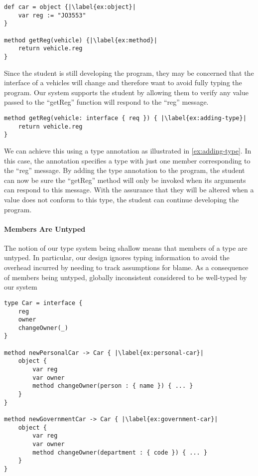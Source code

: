 \begin{lstlisting}[caption={The start of a simple program for tracking vehicle information.},escapechar=|]
def car = object {|\label{ex:object}|
    var reg := "JO3553"
}

method getReg(vehicle) {|\label{ex:method}|
    return vehicle.reg
}
\end{lstlisting}

Since the student is still developing the program, 
they may be concerned that the interface of a vehicles will change 
and therefore want to avoid fully typing the program.
Our system supports the student by allowing them to verify
any value passed to the ``getReg'' function will respond
to the ``reg'' message. 


\begin{lstlisting}[caption={Adding a type annotation to a method parameter.},escapechar=|]
method getReg(vehicle: interface { req }) { |\label{ex:adding-type}|
    return vehicle.reg
}
\end{lstlisting}

We can achieve this using a type annotation 
as illustrated in \cref{ex:adding-type}. 
In this case, 
the annotation specifies a type with just one member
corresponding to the ``reg'' message.
By adding the type annotation to the program, 
the student can now be sure the ``getReg'' method
will only be invoked when its arguments can respond to this message.
With the assurance that they will be altered when a value 
does not conform to this type,
the student can continue developing the program.

\paragraph{Members Are Untyped}

The notion of our type system being shallow means 
that members of a type are untyped.
In particular, our design ignores typing information
to avoid the overhead incurred by needing to track assumptions for blame.
As a consequence of members being untyped, globally inconsistent considered to be well-typed by our system


\begin{lstlisting}[caption={Adding a type annotation to a method parameter.},escapechar=|]
type Car = interface {
    reg
    owner
    changeOwner(_)
}

method newPersonalCar -> Car { |\label{ex:personal-car}|
    object {
        var reg
        var owner
        method changeOwner(person : { name }) { ... }
    }
}

method newGovernmentCar -> Car { |\label{ex:government-car}|
    object {
        var reg
        var owner
        method changeOwner(department : { code }) { ... }
    }
}
\end{lstlisting}


